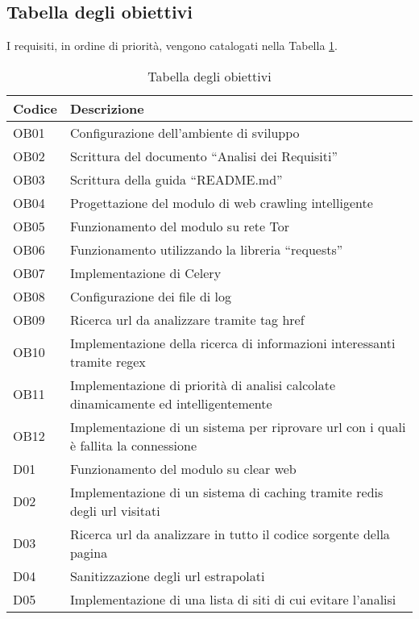 \subsection{Tabella degli obiettivi} \label{subsec: Tabella obiettivi}
I requisiti, in ordine di priorità, vengono catalogati nella Tabella \ref{tab:tabella-obiettivi}.
\begin{longtable}{|p{}|p{}|}
	\caption{Tabella degli obiettivi}
	\label{tab:tabella-obiettivi} \\
	\hline
	\textbf{Codice}	&	\textbf{Descrizione} \\
    \hline
    OB01		&	Configurazione dell’ambiente di sviluppo \\  
	\hline
    OB02		&	Scrittura del documento ``Analisi dei Requisiti'' \\ 
	\hline
    OB03		&	Scrittura della guida ``README.md'' \\
    \hline
    OB04		&	Progettazione del modulo di web crawling intelligente \\
    \hline
    OB05		&	Funzionamento del modulo su rete Tor \\
    \hline
    OB06		&	Funzionamento utilizzando la libreria ``requests''  \\
    \hline
    OB07		&	Implementazione di Celery \\
    \hline
    OB08		&	Configurazione dei file di log \\
    \hline
    OB09		&	Ricerca url da analizzare tramite tag href \\
    \hline
    OB10		&	Implementazione della ricerca di informazioni interessanti tramite regex \\
    \hline
    OB11		&	Implementazione di priorità di analisi calcolate dinamicamente ed intelligentemente \\
    \hline
    OB12		&	Implementazione di un sistema per riprovare url con i quali è fallita la connessione \\
    \hline
    D01			&	Funzionamento del modulo su clear web \\
    \hline
    D02			&	Implementazione di un sistema di caching tramite redis degli url visitati \\
    \hline
    D03			&	Ricerca url da analizzare in tutto il codice sorgente della pagina \\
    \hline
    D04			&	Sanitizzazione degli url estrapolati \\
    \hline
    D05			&	Implementazione di una lista di siti di cui evitare l’analisi \\

\end{longtable}
